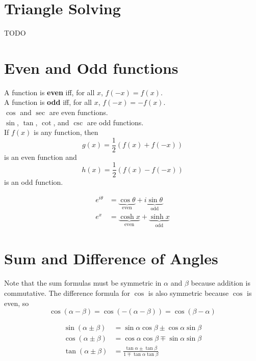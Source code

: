 \documentclass{article}
\begin{document}
        \section{Triangle Solving}

        TODO

        \section{Even and Odd functions}
        
        A function is \textbf{even} iff, for all $x$, $f(-x) = f(x)$.\\
        A function is \textbf{odd} iff, for all $x$, $f(-x) = -f(x)$.\\
        $\cos$ and $\sec$ are even functions.\\
        $\sin$, $\tan$, $\cot$, and $\csc$ are odd functions.\\
        If $f(x)$ is any function, then \[ g(x) = \frac{1}{2}(f(x) + f(-x)) \] is an even function and \[ h(x) = \frac{1}{2}(f(x) - f(-x)) \] is an odd function.
        
        \begin{align}
                e^{i \theta} &= \underbrace{\cos \theta}_\text{even} + i \underbrace{\sin \theta}_\text{odd}\\
                e^{x} &= \underbrace{\cosh x}_\text{even} + \underbrace{\sinh x}_\text{odd}
        \end{align}

        \section{Sum and Difference of Angles}

        Note that the sum formulas must be symmetric in $\alpha$ and $\beta$ because addition is commutative. The difference formula for $\cos$ is also symmetric because $\cos$ is even, so \[ \cos(\alpha - \beta) = \cos(-(\alpha - \beta)) = \cos(\beta - \alpha) \]

        \begin{align}
                \sin(\alpha \pm \beta) &= \sin \alpha \cos \beta \pm \cos \alpha \sin \beta\\
                \cos(\alpha \pm \beta) &= \cos \alpha \cos \beta \mp \sin \alpha \sin \beta\\
                \tan(\alpha \pm \beta) &= \frac{\tan \alpha \pm \tan \beta}{1 \mp \tan \alpha \tan \beta}
        \end{align}
\end{document}
